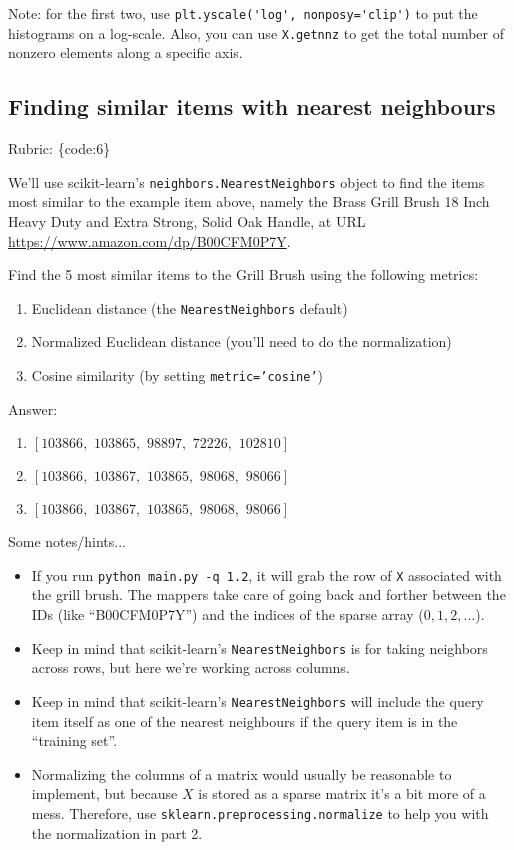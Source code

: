 \documentclass{article}
\def\rubric#1{\gre{Rubric: \{#1\}}}{}
\def\blu#1{{\color{blu}#1}}
\def\gre#1{{\color{gre}#1}}
\begin{document}
Note: for the first two, use \verb|plt.yscale('log', nonposy='clip')| to put the histograms on a log-scale. Also, you can use \verb|X.getnnz| to get the total number of nonzero elements along a specific axis.

\subsection{Finding similar items with nearest neighbours}
\rubric{code:6}

We'll use scikit-learn's \texttt{neighbors.NearestNeighbors} object to find the items most similar to the example item above, namely the Brass Grill Brush 18 Inch Heavy Duty and Extra Strong, Solid Oak Handle, at URL \url{https://www.amazon.com/dp/B00CFM0P7Y}.

\blu{Find the 5 most similar items to the Grill Brush using the following metrics:}

\begin{enumerate}
\item Euclidean distance (the \texttt{NearestNeighbors} default)
\item Normalized Euclidean distance (you'll need to do the normalization)
\item Cosine similarity (by setting \texttt{metric='cosine'})
\end{enumerate}

\gre{Answer:
\begin{enumerate}
    \item $[103866,\,\,  103865,\,\,   98897,\,\,   72226,\,\, 102810]$
    \item $[103866,\,\, 103867,\,\, 103865,\,\,  98068,\,\,  98066]$
    \item $[103866,\,\, 103867,\,\, 103865,\,\,  98068,\,\,  98066]$
\end{enumerate}
}
Some notes/hints...

\begin{itemize}
\item If you run \texttt{python main.py -q 1.2}, it will grab the row of \texttt{X} associated with the grill brush. The mappers take care of going back and forther between the IDs (like ``B00CFM0P7Y'') and the indices of the sparse array ($0,1,2,\ldots$).
\item Keep in mind that scikit-learn's \texttt{NearestNeighbors} is for taking neighbors across rows, but here we're working across columns.
\item Keep in mind that scikit-learn's \texttt{NearestNeighbors} will include the query item itself as one of the nearest neighbours if the query item is in the ``training set''.
\item Normalizing the columns of a matrix would usually be reasonable to implement, but because $X$ is stored as a sparse matrix it's a bit more of a mess. Therefore, use \texttt{sklearn.preprocessing.normalize} to help you with the normalization in part 2.
\end{itemize}
\end{document}
